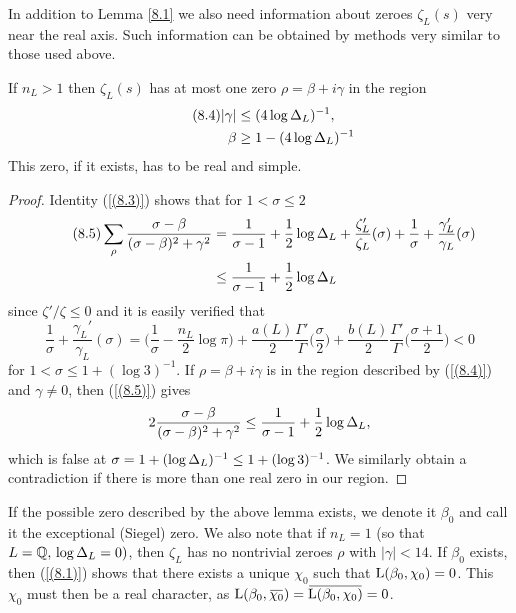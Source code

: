 \documentclass[./main]{subfiles}
\begin{document}
In addition to Lemma \ref{8.1} we also need information about zeroes $\zeta_L(s)$ very near the real axis. Such information can be obtained by methods very similar to those used above.
\begin{lemma}\label{8.2}
If $n_L > 1$ then $\zeta_L(s)$ has at most one zero $\rho = \beta + i \gamma$ in the region 
\begin{align*}\tag{8.4}\label{(8.4)}
    |\gamma| &\leq (4 \log \Delta_L)^{-1},\\
    \beta &\geq 1 - (4 \log \Delta_L)^{-1}
\end{align*}
This zero, if it exists, has to be real and simple.
\end{lemma}
\begin{proof}
Identity (\ref{(8.3)}) shows that for $1 < \sigma \leq 2$
\begin{align*}\tag{8.5}\label{(8.5)} \sum_{\rho} \frac{\sigma - \beta}{(\sigma - \beta)^2 + \gamma^2} &= \frac{1}{\sigma - 1} + \frac{1}{2}\log \Delta_L + \frac{\zeta_L'}{\zeta_L}(\sigma) + \frac{1}{\sigma} + \frac{\gamma_L'}{\gamma_L}(\sigma) \\
&\leq \frac{1}{\sigma - 1} + \frac{1}{2} \log \Delta_L
\end{align*}
since $\zeta'/\zeta \leq 0$ and it is easily verified that
\[ \frac{1}{\sigma} + \frac{\gamma_L'}{\gamma_L}(\sigma) = \Big(\frac{1}{\sigma} - \frac{n_L}{2} \log \pi \Big) + \frac{a(L)}{2}\frac{\Gamma'}{\Gamma}\Big(\frac{\sigma}{2}\Big) + \frac{b(L)}{2} \frac{\Gamma'}{\Gamma}\Big(\frac{\sigma+1}{2}\Big) < 0
\]
for $1 < \sigma \leq 1 + (\log 3)^{-1}$. If $\rho = \beta + i \gamma$ is in the region described by (\ref{(8.4)}) and $\gamma \neq 0$, then (\ref{(8.5)}) gives 
\[2 \frac{\sigma - \beta}{(\sigma - \beta)^2 + \gamma^2} \leq \frac{1}{\sigma - 1}  + \frac{1}{2}\log \Delta_L,
\]
which is false at $\sigma = 1 + (\log \Delta_L)^{-1} \leq 1 + (\log 3)^{-1}$. We similarly obtain a contradiction if there is more than one real zero in our region. 
\end{proof}
If the possible zero described by the above lemma exists, we denote it $\beta_0$ and call it the exceptional (Siegel) zero. We also note that if $n_L = 1$ (so that $L = \mathbb{Q}, \,\log \Delta_L = 0)$, then $\zeta_L$ has no nontrivial zeroes $\rho$ with $|\gamma| < 14$. If $\beta_0$ exists, then (\ref{(8.1)}) shows that there exists a unique $\chi_0$ such that $\operatorname{L}(\beta_0, \chi_0) = 0$. This $\chi_0$ must then be a real character, as $\L(\beta_0, \xoverline{\chi_0}) = \xoverline{\L(\beta_0, \chi_0)} = 0$.
\end{document}
